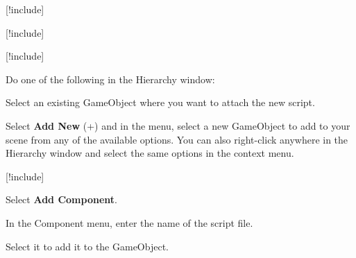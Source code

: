 \begin{DoxyEnumerate}
\item \mbox{[}!include\mbox{]}
\end{DoxyEnumerate}
\begin{DoxyEnumerate}
\item \mbox{[}!include\mbox{]}
\end{DoxyEnumerate}
\begin{DoxyEnumerate}
\item \mbox{[}!include\mbox{]}
\end{DoxyEnumerate}
\begin{DoxyEnumerate}
\item Do one of the following in the Hierarchy window\+:
\begin{DoxyItemize}
\item Select an existing Game\+Object where you want to attach the new script.
\item Select {\bfseries{Add New}} (+) and in the menu, select a new Game\+Object to add to your scene from any of the available options. You can also right-\/click anywhere in the Hierarchy window and select the same options in the context menu.
\end{DoxyItemize}
\end{DoxyEnumerate}
\begin{DoxyEnumerate}
\item \mbox{[}!include\mbox{]}
\end{DoxyEnumerate}
\begin{DoxyEnumerate}
\item Select {\bfseries{Add Component}}.
\end{DoxyEnumerate}
\begin{DoxyEnumerate}
\item In the Component menu, enter the name of the script file.
\end{DoxyEnumerate}
\begin{DoxyEnumerate}
\item Select it to add it to the Game\+Object.
\end{DoxyEnumerate}
